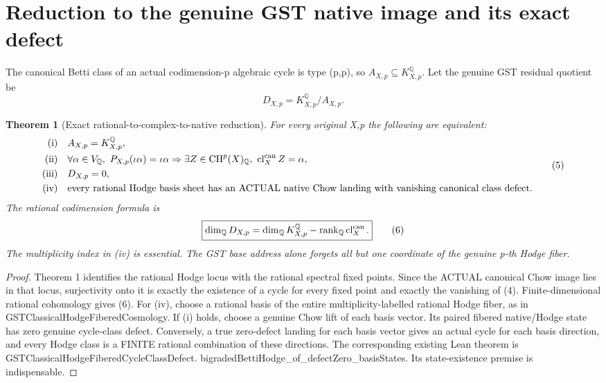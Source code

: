 \documentclass[11pt]{article}
\newtheorem{theorem}{Theorem}
\newcommand{\QQ}{\mathbb Q}
\newcommand{\CH}{\mathrm{CH}}
\newcommand{\cl}{\operatorname{cl}}
\begin{document}
\section{Reduction to the genuine GST native image and its exact defect}
The canonical Betti class of an actual codimension-p algebraic
cycle is type (p,p), so \(A_{X,p}\subseteq K^\QQ_{X,p}\).
Let the genuine GST residual quotient be
\[
 \boxed{D_{X,p}=K^\QQ_{X,p}/A_{X,p}.}            \tag{4}
\]
\begin{theorem}[Exact rational-to-complex-to-native reduction]
For every original X,p the following are equivalent:
\[
\begin{split}
 \mathrm{(i)}\quad&A_{X,p}=K^\QQ_{X,p},\\
 \mathrm{(ii)}\quad&
 \forall\alpha\in V_\QQ,\
  P_{X,p}(\iota\alpha)=\iota\alpha
  \Rightarrow\exists Z\in\CH^p(X)_\QQ,\
                         \cl_X^{\rm can}Z=\alpha,\\
 \mathrm{(iii)}\quad&D_{X,p}=0,\\
 \mathrm{(iv)}\quad&
 \text{every rational Hodge basis sheet has an ACTUAL
 native Chow landing with vanishing canonical class defect.}
\end{split}                                                     \tag{5}
\]
The rational codimension formula is
\[
 \boxed{\dim_{\QQ}D_{X,p}=
   \dim_{\QQ}K^\QQ_{X,p}
           -\operatorname{rank}_{\QQ}\cl_X^{\rm can}.} \tag{6}
\]
The multiplicity index in (iv) is essential.
The GST base address alone forgets all but one coordinate
of the genuine p-th Hodge fiber.
\end{theorem}
\begin{proof}
Theorem 1 identifies the rational Hodge locus with the
rational spectral fixed points.
Since the ACTUAL canonical Chow image lies in that locus,
surjectivity onto it is exactly the existence of a cycle
for every fixed point and exactly the vanishing of (4).
Finite-dimensional rational cohomology gives (6).
For (iv), choose a rational basis of the entire
multiplicity-labelled rational Hodge fiber, as in
GSTClassicalHodgeFiberedCosmology.
If (i) holds, choose a genuine Chow lift of each basis
vector. Its paired fibered native/Hodge state has zero
genuine cycle-class defect. Conversely, a true zero-defect
landing for each basis vector gives an actual cycle for
each basis direction, and every Hodge class is a FINITE
rational combination of these directions.
The corresponding existing Lean theorem is
GSTClassicalHodgeFiberedCycleClassDefect.
bigradedBettiHodge_of_defectZero_basisStates.
Its state-existence premise is indispensable.
\end{proof}
\end{document}
